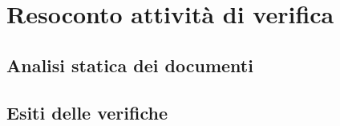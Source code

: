 \chapter{Resoconto attività di verifica}
\section{Analisi statica dei documenti}%
\section{Esiti delle verifiche}
